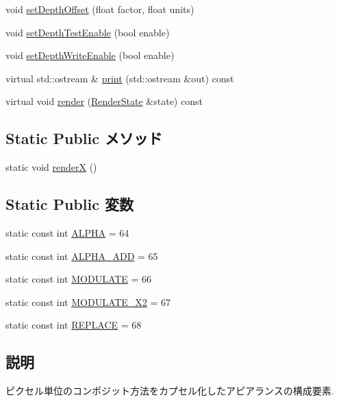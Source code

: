 \begin{CompactItemize}
\item 
void \hyperlink{classm3g_1_1CompositingMode_4c825055ad0b5910ef4f9136d9a8e588}{setDepthOffset} (float factor, float units)
\item 
void \hyperlink{classm3g_1_1CompositingMode_5f1afccdc51665bb04c971579d8ee05c}{setDepthTestEnable} (bool enable)
\item 
void \hyperlink{classm3g_1_1CompositingMode_a3275c9589ef319c6ba6f5c22d0b2860}{setDepthWriteEnable} (bool enable)
\item 
virtual std::ostream \& \hyperlink{classm3g_1_1CompositingMode_6fea17fa1532df3794f8cb39cb4f911f}{print} (std::ostream \&out) const 
\item 
virtual void \hyperlink{classm3g_1_1CompositingMode_8babc8a79b78615da51161e94029eea9}{render} (\hyperlink{structm3g_1_1RenderState}{RenderState} \&state) const 
\end{CompactItemize}
\subsection*{Static Public メソッド}
\begin{CompactItemize}
\item 
static void \hyperlink{classm3g_1_1CompositingMode_443a7a301f77f625335ecc06d13bad06}{renderX} ()
\end{CompactItemize}
\subsection*{Static Public 変数}
\begin{CompactItemize}
\item 
static const int \hyperlink{classm3g_1_1CompositingMode_417581fcde4067111f47320edb2aa378}{ALPHA} = 64
\item 
static const int \hyperlink{classm3g_1_1CompositingMode_91ac80a5450e5f7f7e382860829030d9}{ALPHA\_\-ADD} = 65
\item 
static const int \hyperlink{classm3g_1_1CompositingMode_96b64c2847348fb73a90c4a501cda9d1}{MODULATE} = 66
\item 
static const int \hyperlink{classm3g_1_1CompositingMode_cb426684e42a5ae425989c65fbb7dbc4}{MODULATE\_\-X2} = 67
\item 
static const int \hyperlink{classm3g_1_1CompositingMode_47a00ac5a59817a48db06fb2a538883c}{REPLACE} = 68
\end{CompactItemize}


\subsection{説明}
ピクセル単位のコンポジット方法をカプセル化したアピアランスの構成要素. 

